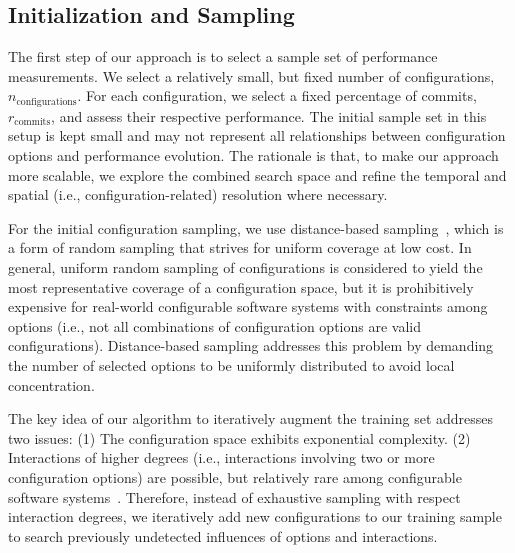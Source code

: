 \documentclass[sigconf]{acmart}
\begin{document}
	\subsection{Initialization and Sampling}\label{sec:initialization}
	The first step of our approach is to select a sample set of performance measurements. 
	We select a relatively small, but fixed number of configurations, $n_\text{configurations}$. For each configuration, we select a fixed percentage of commits, $r_\text{commits}$, and assess their respective performance.
	The initial sample set in this setup is kept small and may not represent all relationships between configuration options and performance evolution. 
	The rationale is that, to make our approach more scalable, we explore the combined search space and refine the temporal and  spatial (i.e., configuration-related) resolution where necessary. 
	
	For the initial configuration sampling, we use distance-based  sampling~\cite{kaltenecker_distance-based_2019}, which is a form of random sampling that strives for uniform coverage at low cost. 
	In general, uniform random sampling of configurations is considered to yield the most representative coverage of a configuration space, but it is prohibitively expensive for real-world configurable software systems with constraints among options (i.e., not all combinations of configuration options are valid configurations). 
	Distance-based sampling addresses this problem by demanding the number of selected options to be uniformly distributed to avoid local concentration. 
	
	The key idea of our algorithm to iteratively augment the training set addresses two issues: (1) The configuration space exhibits exponential complexity. 
	(2) Interactions of higher degrees (i.e., interactions involving two or more configuration options) are possible, but relatively rare among configurable software systems~\cite{kolesnikov_relation_2019,kolesnikov_tradeoffs_2019}. Therefore, instead of exhaustive sampling with respect interaction degrees, we iteratively add new configurations to our training sample to search previously undetected influences of options and interactions.
	
\end{document}
